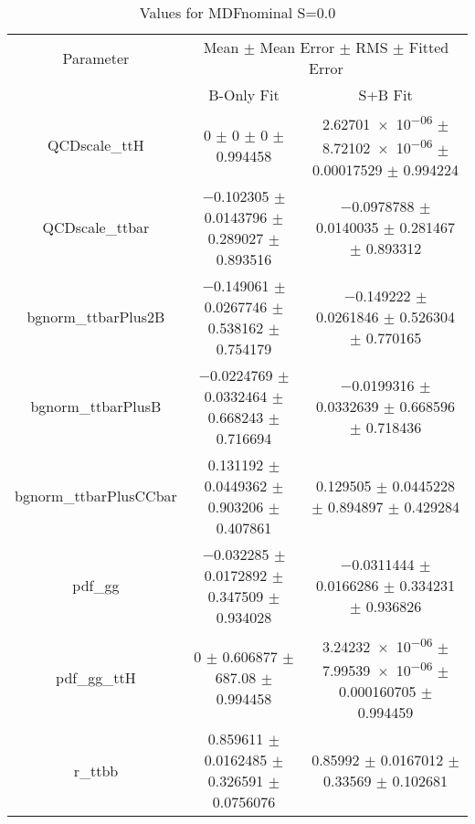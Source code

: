 \begin{table}
\centering
\caption{Values for MDFnominal S=0.0}
\begin{tabular}{ccc}
\toprule
Parameter & \multicolumn{2}{c}{Mean $\pm$ Mean Error $\pm$ RMS $\pm$ Fitted Error}\\
 & B-Only Fit & S+B Fit\\
\midrule
QCDscale\_ttH & \num{0} $\pm$ \num{0} $\pm$ \num{0} $\pm$ \num{0.994458} & \num{2.62701e-06} $\pm$ \num{8.72102e-06} $\pm$ \num{0.00017529} $\pm$ \num{0.994224}\\
QCDscale\_ttbar & \num{-0.102305} $\pm$ \num{0.0143796} $\pm$ \num{0.289027} $\pm$ \num{0.893516} & \num{-0.0978788} $\pm$ \num{0.0140035} $\pm$ \num{0.281467} $\pm$ \num{0.893312}\\
bgnorm\_ttbarPlus2B & \num{-0.149061} $\pm$ \num{0.0267746} $\pm$ \num{0.538162} $\pm$ \num{0.754179} & \num{-0.149222} $\pm$ \num{0.0261846} $\pm$ \num{0.526304} $\pm$ \num{0.770165}\\
bgnorm\_ttbarPlusB & \num{-0.0224769} $\pm$ \num{0.0332464} $\pm$ \num{0.668243} $\pm$ \num{0.716694} & \num{-0.0199316} $\pm$ \num{0.0332639} $\pm$ \num{0.668596} $\pm$ \num{0.718436}\\
bgnorm\_ttbarPlusCCbar & \num{0.131192} $\pm$ \num{0.0449362} $\pm$ \num{0.903206} $\pm$ \num{0.407861} & \num{0.129505} $\pm$ \num{0.0445228} $\pm$ \num{0.894897} $\pm$ \num{0.429284}\\
pdf\_gg & \num{-0.032285} $\pm$ \num{0.0172892} $\pm$ \num{0.347509} $\pm$ \num{0.934028} & \num{-0.0311444} $\pm$ \num{0.0166286} $\pm$ \num{0.334231} $\pm$ \num{0.936826}\\
pdf\_gg\_ttH & \num{0} $\pm$ \num{0.606877} $\pm$ \num{687.08} $\pm$ \num{0.994458} & \num{3.24232e-06} $\pm$ \num{7.99539e-06} $\pm$ \num{0.000160705} $\pm$ \num{0.994459}\\
r\_ttbb & \num{0.859611} $\pm$ \num{0.0162485} $\pm$ \num{0.326591} $\pm$ \num{0.0756076} & \num{0.85992} $\pm$ \num{0.0167012} $\pm$ \num{0.33569} $\pm$ \num{0.102681}\\
\bottomrule
\end{tabular}
\end{table}